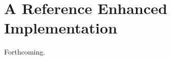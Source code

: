 \section{A Reference Enhanced Implementation}\label{sec:enhanced-implementation-\myInitials}


Forthcoming.
